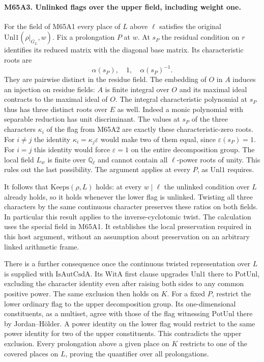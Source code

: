 \paragraph{M65A3. Unlinked flags over the upper field, including weight one.}
For the field of M65A1 every place of $L$ above $\ell$ satisfies the
original $\mathrm{Unl1}(\rho|_{G_L},w)$. Fix a prolongation $P$ at
$w$. At $s_P$ the residual condition on $r$ identifies its reduced
matrix with the diagonal base matrix. Its characteristic roots are
\[
                   \alpha(s_P),\quad 1,\quad\alpha(s_P)^{-1}.
\]
They are pairwise distinct in the residue field. The embedding of $O$
in $A$ induces an injection on residue fields: $A$ is finite integral
over $O$ and its maximal ideal contracts to the maximal ideal of $O$.
The integral characteristic polynomial at $s_P$ thus has three
distinct roots over $E$ as well. Indeed a monic polynomial with
separable reduction has unit discriminant. The values at $s_P$ of
the three characters $\kappa_i$ of the flag from M65A2 are exactly
these characteristic-zero roots. For $i\ne j$ the identity
$\kappa_i=\kappa_j\varepsilon$ would make two of them equal,
since $\varepsilon(s_P)=1$. For $i=j$ this identity would force
$\varepsilon=1$ on the entire decomposition group. The local field
$L_w$ is finite over $\mathbb Q_\ell$ and cannot contain all
$\ell$-power roots of unity. This rules out the last possibility.
The argument applies at every $P$, as $\mathrm{Unl1}$ requires.

It follows that $\mathrm{Keeps}(\rho,L)$ holds: at every $w\mid\ell$
the unlinked condition over $L$ already holds, so it holds whenever
the lower flag is unlinked. Twisting all three characters by the
same continuous character preserves these ratios on both fields.
In particular this result applies to the inverse-cyclotomic twist.
The calculation uses the special field in M65A1. It establishes
the local preservation required in this host argument, without an
assumption about preservation on an arbitrary linked arithmetic frame.

There is a further consequence once the continuous twisted
representation over $L$ is supplied with $\mathrm{IsAutCsdA}$.
Its $\mathrm{WitA}$ first clause upgrades $\mathrm{Unl1}$ there to
$\mathrm{PotUnl}$, excluding the character identity even after
raising both sides to any common positive power. The same exclusion
then holds on $K$. For a fixed $P$, restrict the lower ordinary flag
to the upper decomposition group. Its one-dimensional constituents,
as a multiset, agree with those of the flag witnessing
$\mathrm{PotUnl}$ there by Jordan--H\"older. A power identity on the
lower flag would restrict to the same power identity for two of the
upper constituents. This contradicts the upper exclusion. Every
prolongation above a given place on $K$ restricts to one of the
covered places on $L$, proving the quantifier over all prolongations.

